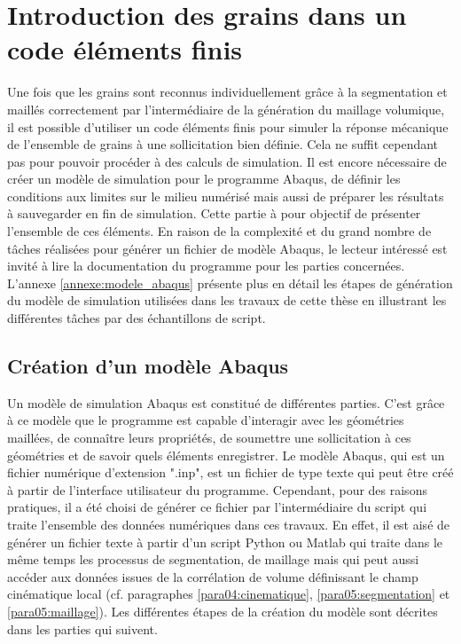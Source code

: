 \section{Introduction des grains dans un code éléments finis}
	Une fois que les grains sont reconnus individuellement grâce à la segmentation et maillés correctement par l'intermédiaire de la génération du maillage volumique, il est possible d'utiliser un code éléments finis pour simuler la réponse mécanique de l'ensemble de grains à une sollicitation bien définie. Cela ne suffit cependant pas pour pouvoir procéder à des calculs de simulation. Il est encore nécessaire de créer un modèle de simulation pour le programme Abaqus, de définir les conditions aux limites sur le milieu numérisé mais aussi de préparer les résultats à sauvegarder en fin de simulation. Cette partie à pour objectif de présenter l'ensemble de ces éléments. En raison de la complexité et du grand nombre de tâches réalisées pour générer un fichier de modèle Abaqus, le lecteur intéressé est invité à lire la documentation du programme \citep{abaqus2016} pour les parties concernées. L'annexe \ref{annexe:modele_abaqus} présente plus en détail les étapes de génération du modèle de simulation utilisées dans les travaux de cette thèse en illustrant les différentes tâches par des échantillons de script.
	\subsection{Création d'un modèle Abaqus}\label{para05:abaqus}
		Un modèle de simulation Abaqus est constitué de différentes parties. C'est grâce à ce modèle que le programme est capable d'interagir avec les géométries maillées, de connaître leurs propriétés, de soumettre une sollicitation à ces géométries et de savoir quels éléments enregistrer. Le modèle Abaqus, qui est un fichier numérique d'extension ".inp", est un fichier de type texte qui peut être créé à partir de l'interface utilisateur du programme. Cependant, pour des raisons pratiques, il a été choisi de générer ce fichier par l'intermédiaire du script qui traite l'ensemble des données numériques dans ces travaux. En effet, il est aisé de générer un fichier texte à partir d'un script Python ou Matlab qui traite dans le même temps les processus de segmentation, de maillage mais qui peut aussi accéder aux données issues de la corrélation de volume définissant le champ cinématique local (cf. paragraphes \ref{para04:cinematique}, \ref{para05:segmentation} et \ref{para05:maillage}). Les différentes étapes de la création du modèle sont décrites dans les parties qui suivent.
